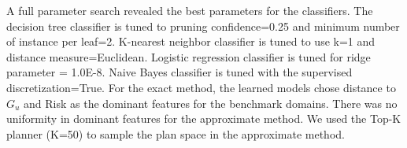 
A full parameter search revealed the best parameters for the classifiers. The decision tree classifier is tuned to pruning confidence=0.25 and minimum number of instance per leaf=2. K-nearest neighbor classifier is tuned to use k=1 and distance measure=Euclidean. Logistic regression classifier is tuned for ridge parameter = 1.0E-8. Naive Bayes classifier is tuned with the supervised discretization=True. For the exact method, the learned models chose distance to $G_u$ and Risk as the dominant features for the benchmark domains. There was no uniformity in dominant features for the approximate method. We used the Top-K planner (K=50) \cite{riabov2014} to sample the plan space in the approximate method.


% 
 

